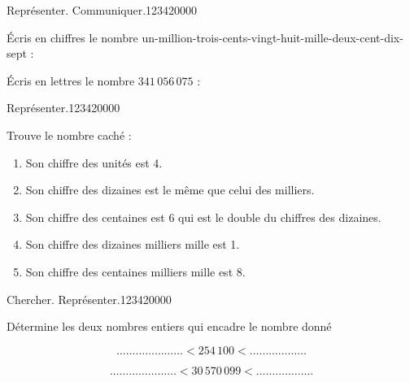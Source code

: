  

 
\begin{pageParcoursd}

\begin{ExoCd}{Représenter. Communiquer.}{1234}{2}{0}{0}{0}{0}

Écris en chiffres le nombre un-million-trois-cents-vingt-huit-mille-deux-cent-dix-sept : 

Écris en lettres le nombre $341\,056\,075$ : 
  
\end{ExoCd}



\begin{ExoCd}{Représenter.}{1234}{2}{0}{0}{0}{0}

Trouve le nombre caché :

\begin{minipage}{0.7\linewidth}

\begin{enumerate}[leftmargin=*]  
\item Son chiffre des unités est 4.
\item Son chiffre des dizaines est le même que celui des milliers.
\item Son chiffre des centaines est 6 qui est le double du chiffres des dizaines.
\item Son chiffre des dizaines milliers mille est 1.
\item Son chiffre des centaines milliers mille est 8.
\end{enumerate}
 \end{minipage}
 \begin{minipage}{0.3\linewidth}
\end{minipage} 
\end{ExoCd}

\begin{ExoCd}{Chercher. Représenter.}{1234}{2}{0}{0}{0}{0}

Détermine les deux nombres entiers qui encadre le nombre donné  \vspace{0.1cm}

$$\ldots\ldots\ldots\ldots\ldots\ldots\ldots <  254\,100< \ldots\ldots\ldots\ldots\ldots\ldots$$

$$\ldots\ldots\ldots\ldots\ldots\ldots\ldots < 30\,570\,099< \ldots\ldots\ldots\ldots\ldots\ldots$$


\end{ExoCd}
\end{pageParcoursd}
